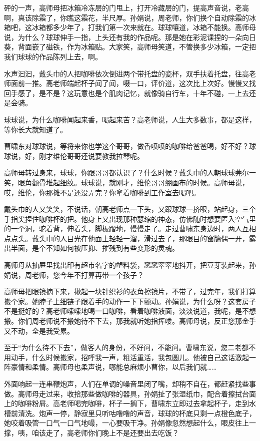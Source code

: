 \documentclass[lang=cn,newtx,12pt,scheme=chinese]{elegantbook}
\begin{document}
砰的一声，高师母把冰箱冷冻层的门甩上，打开冷藏层的门，提高声音说，老高啊，真该除霜了，你瞧这霜花，半尺厚。孙娟说，周老师，你们换个自动除霜的冰箱吧，这冰箱都多少年了，打我们第一次来就在。球球嚷道，冰箱不能换。高师母说，为什么？球球伸手一指，上头还有我的作品呢。那是她在彩泥课捏的一朵向日葵，背面嵌了磁铁，作为冰箱贴。大家笑，高师母笑道，不管换多少冰箱，一定把我们球球的作品陈列上去，啊。

水声汩汩，戴头巾的人把咖啡依次倒进两个带托盘的瓷杯，双手扶着托盘，往高老师面前一推。高老师端起杯子闻了闻，啜一口，评价道，这次比上次好。慢慢又找回手感了，是不是？这玩意也是个肌肉记忆，就像骑自行车，十年不碰，一上去还是会骑。

球球说，为什么咖啡闻起来香，喝起来苦？高老师说，人生大多数事，都是这样，等你长大就知道了。

曹啸东对球球说，等将来你也学这个哥哥，做香喷喷的咖啡给爸爸喝，好不好？球球说，好，刚才维伦哥哥还说要教我拉琴呢。

高师母转过身来，球球，你跟哥哥都认识了？什么时候？戴头巾的人朝球球莞尔一笑，眼角颧骨堆起细纹。球球说，就刚才，维伦哥哥绷画布的时候。高师母说，哎，维伦，你那摊不是还没弄完？你拿着咖啡到工作室去喝吧。

戴头巾的人又笑笑，不说话，朝高老师点一下头，又跟球球一挤眼，站起身，三个手指尖捏住咖啡杯的把。他身上又出现那种瑟缩的神态，仿佛随时想要匿入空气里的一个洞，驼着背，伸着头，脚板蹭地，慢慢走了。走过曹啸东身边时，两人互相点点头。戴头巾的人目光在他面上轻轻一溜，滑过去了，那眼目的窗牗偶一开，露出半面，是个不知如何被压抑、摧残到有些变形的灵魂。

高师母从抽屉里找出印有超市名字的塑料袋，窸窸窣窣地抖开，把豆芽装起来，孙娟说，周老师，您今年不打算再带一个孩子？

高师母把眼镜摘下来，揪起一块针织衫的衣角擦镜片，不带了，过完年，我们打算搬个家。她脖子上细链子跟着手的动作一下下颤动。孙娟说，为什么呀？这套房子不是挺好的？高老师嗦嗦地喝一口咖啡，看着咖啡液面，淡淡说道，我呢，是不想搬。你们周老师说不搬她待不下去，那我就听她指挥喽。高师母说，反正您那金手又不动，全是我受累。

至于“为什么待不下去”，做客人的身份，不好问，不能问。曹啸东说，您二老都不用动手，什么时候搬家，招呼我一声，粗活重活，我包圆儿。他被自己这话激起一阵豪情和柔情。高师母也柔声说，哪能总麻烦小曹你，以后我们就……

外面响起一连串鞭炮声，人们在单调的噪音里闭了嘴，却稍不自在，都赶紧找些事做。高师母走过来，收拾那些做咖啡的器具，孙娟扯了张湿纸巾，配合着擦拭台面上的咖啡粉屑。高老师喝完咖啡，杯子一搁下，曹啸东立即过去拿起杯子，走到水槽前清洗。炮声一停，静寂里只听咕噜噜的声音，球球的杯底只剩一点橙色底子，她咬着吸管一口气一口气地嘬，一心要吸干净。孙娟像忽然想起什么，眼皮往上一撑，咦，咱该走了，高老师你们晚上不是还要出去吃饭？
\end{document}
